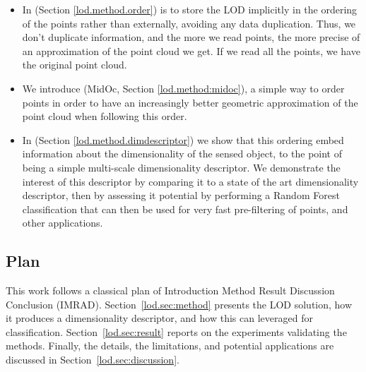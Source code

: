 	  
	\begin{itemize}
			\item   In (Section \ref{lod.method.order}) is to store the LOD implicitly in the ordering of the points rather than externally, avoiding any data duplication.
			Thus, we don't duplicate information, and the more we read points, the more precise of an approximation of the point cloud we get. If we read all the points, we have the original point cloud.
			
			\item  We introduce (MidOc, Section \ref{lod.method:midoc}), a simple way to order points in order to have an increasingly better geometric approximation of the point cloud when following this order.
			
			\item 	 In  (Section \ref{lod.method.dimdescriptor}) we show that this ordering embed information about the dimensionality of the sensed object,
			to the point of being a simple multi-scale dimensionality descriptor.
			We demonstrate the interest of this descriptor by comparing it to a state of the art dimensionality descriptor, then by assessing it potential by performing a Random Forest classification that can then be used for very fast pre-filtering of points, and other applications.
	\end{itemize}	
	
	 
\subsection{Plan}
	This work follows a classical plan of Introduction Method Result Discussion Conclusion (IMRAD).
	Section~\ref{lod.sec:method} presents the LOD solution, how it produces a dimensionality descriptor, and how this can leveraged for classification.  
	Section~\ref{lod.sec:result} reports on the experiments validating the methods.
	Finally, the details, the limitations, and potential applications are discussed in Section~\ref{lod.sec:discussion}.
	
